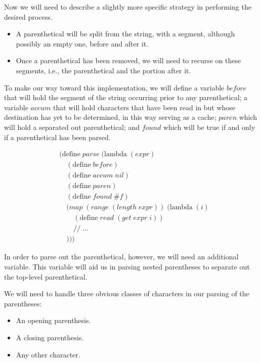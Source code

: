 Now we will need to describe a slightly more specific strategy in performing the desired 
process.

\begin{itemize}
  \item A parenthetical will be split from the string, with a segment, although possibly an empty one, before and after it.
  \item Once a parenthetical has been removed, we will need to recurse on these segments, i.e., the parenthetical and the portion after it.
\end{itemize}

To make our way toward this implementation, we will define a variable $before$ that will 
hold the segment of the string occurring prior to any parenthetical; a variable $accum$ 
that will hold characters that have been read in but whose destination has yet to be 
determined, in this way serving as a cache; $paren$ which will hold a separated out 
parenthetical; and $found$ which will be true if and only if a parenthetical has been 
parsed.

\begin{figure}[ht]
\caption{}\label{scheme}
\begin{align*}
& (\text{define} \; parse \; (\text{lambda} \; (expr) \; 
\\& \quad (\text{define} \; before)
\\& \quad (\text{define} \; accum \; nil)
\\& \quad (\text{define} \; paren)
\\& \quad (\text{define} \; found \; \#f)
\\& \quad (map \; (range \; (length \; expr)) \; (\text{lambda} \; (i)
\\& \qquad (\text{define} \; read \; (get \; expr \; i))
\\& \qquad // \; \dots
\\& \quad )))
\end{align*}
\end{figure}

In order to parse out the parenthetical, however, we will need an additional variable. 
This variable will aid us in parsing nested parentheses to separate out the top-level parenthetical.

We will need to handle three obvious classes of characters in our parsing of the parentheses:

\begin{itemize}
  \item An opening parenthesis.
  \item A closing parenthesis.
  \item Any other character.
\end{itemize}


